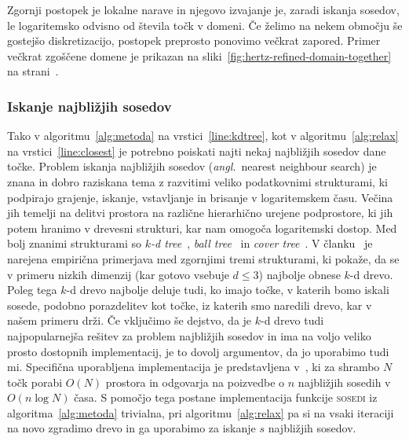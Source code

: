 \documentclass[12pt,a4paper,twoside]{article}
\theoremstyle{definition} %
\theoremstyle{plain} %
\numberwithin{equation}{section}
\newcommand{\ang}[1]{(\hspace{-1.5px}\textit{angl.}\ #1)}
\begin{document}
Zgornji postopek je lokalne narave in njegovo izvajanje je, zaradi iskanja sosedov, le logaritemsko
odvisno od števila točk v domeni. Če želimo na nekem območju še gostejšo diskretizacijo, postopek
preprosto ponovimo večkrat zapored. Primer večkrat zgoščene domene je prikazan na
sliki~\ref{fig:hertz-refined-domain-together} na strani~\pageref{fig:hertz-refined-domain-together}.

\subsubsection{Iskanje najbližjih sosedov}

Tako v algoritmu~\ref{alg:metoda} na vrstici~\ref{line:kdtree}, kot v algoritmu~\ref{alg:relax} na
vrstici~\ref{line:closest} je potrebno poiskati najti nekaj najbližjih sosedov dane točke. Problem
iskanja najbližjih sosedov \ang{nearest neighbour search} je znana in dobro raziskana tema z
razvitimi veliko podatkovnimi strukturami, ki podpirajo grajenje, iskanje, vstavljanje in brisanje v
logaritemskem času. Večina jih temelji na delitvi prostora na različne hierarhično urejene
podprostore, ki jih potem hranimo v drevesni strukturi, kar nam omogoča logaritemski dostop. Med
bolj znanimi strukturami so \emph{$k$-d tree}~\cite{moore1991intoductory}, \emph{ball
tree}~\cite{omohundro1989five} in \emph{cover tree}~\cite{beygelzimer2006cover}. V
članku~\cite{kibriya2007empirical} je narejena empirična primerjava med zgornjimi tremi strukturami,
ki pokaže, da se v primeru nizkih dimenzij (kar gotovo vsebuje $d \leq 3$) najbolje obnese
$k$-d drevo. Poleg tega $k$-d drevo najbolje deluje tudi, ko imajo točke, v katerih
bomo iskali sosede, podobno porazdelitev kot točke, iz katerih smo naredili drevo, kar v našem
primeru drži. Če vključimo še dejstvo, da je $k$-d drevo tudi najpopularnejša rešitev za
problem najbližjih sosedov in ima na voljo veliko prosto dostopnih implementacij, je to dovolj
argumentov, da jo uporabimo tudi mi. Specifična uporabljena implementacija je predstavljena
v~\cite{mount1998ann}, ki za shrambo $N$ točk porabi $O(N)$ prostora in odgovarja na poizvedbe o $n$
najbližjih sosedih v $O(n\log N)$ časa. S pomočjo tega postane implementacija funkcije
\textsc{sosedi} iz algoritma~\ref{alg:metoda} trivialna, pri algoritmu~\ref{alg:relax} pa si na
vsaki iteraciji na novo zgradimo drevo in ga uporabimo za iskanje $s$ najbližjih sosedov.
\end{document}
